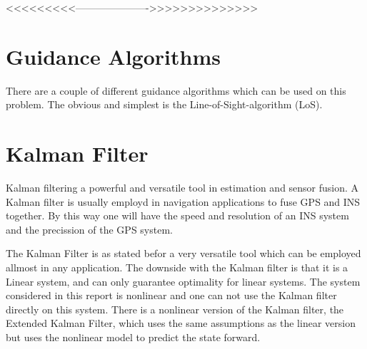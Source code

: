 	<<<<<<<<<---------------------->>>>>>>>>>>>>>

\section{Guidance Algorithms}
	There are a couple of different guidance algorithms which can be used on this problem. The obvious and simplest is the Line-of-Sight-algorithm (LoS). 	
		

\section{Kalman Filter}
	Kalman filtering a powerful and versatile tool in estimation and sensor fusion. A Kalman filter is usually employd in navigation applications to fuse GPS and INS together. By this way one will have the speed and resolution of an INS system and the precission of the GPS system. 

	The Kalman Filter is as stated befor a very versatile tool which can be employed allmost in any application. The downside with the Kalman filter is that it is a Linear system, and can only guarantee optimality for linear systems. The system considered in this report is nonlinear and one can not use the Kalman filter directly on this system. There is a nonlinear version of the Kalman filter, the Extended Kalman Filter, which uses the same assumptions as the linear version but uses the nonlinear model to predict the state forward. 

